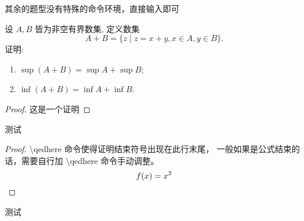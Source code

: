 \begin{exercise}
  其余的题型没有特殊的命令环境，直接输入即可
\end{exercise}

\begin{exercise}
  设 $A, B$ 皆为非空有界数集, 定义数集
  \[
    A+B=\{z \mid z=x+y, x \in A, y \in B\} .
  \]
  证明:
  \begin{enumerate}[(1)]
    \item $\sup (A+B)=\sup A+\sup B$;
    \item $\inf (A+B)=\inf A+\inf B$.
  \end{enumerate}
\end{exercise}

\begin{proof}
  这是一个证明
\end{proof}

\begin{exercise}
  测试
\end{exercise}

\begin{proof}
  \textbackslash qedhere 命令使得证明结束符号出现在此行末尾，
  一般如果是公式结束的话，需要自行加 \textbackslash qedhere 命令手动调整。
    \[
      f(x) = x^2  \qedhere
    \]
\end{proof}

\begin{exercise}
  测试
\end{exercise}